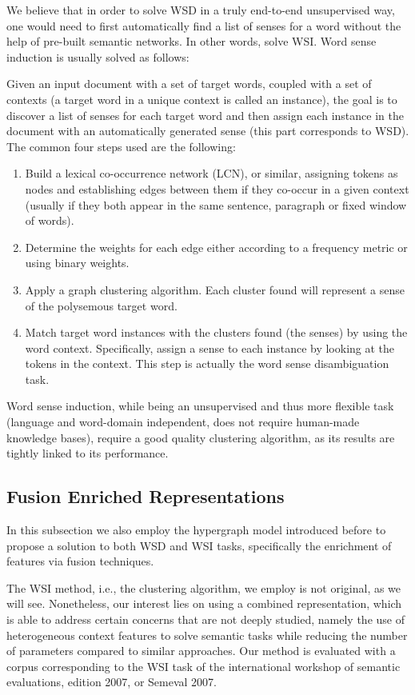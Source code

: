We believe that in order to solve WSD in a truly end-to-end unsupervised way, one would need to first automatically find a list of senses for a word without the help of pre-built semantic networks. In other words, solve WSI. Word sense induction is usually solved as follows:

Given an input document with a set of target words, coupled with a set of contexts (a target word in a unique context is called an instance), the goal is to discover a list of senses for each target word and then assign each instance in the document with an automatically generated sense (this part corresponds to WSD). The common four steps used are the following:

\begin{enumerate}
\item Build a lexical co-occurrence network (LCN), or similar, assigning tokens as nodes and  establishing edges between them if they co-occur in a given context (usually if they both appear in the same sentence, paragraph or fixed window of words).
\item Determine the weights for each edge either according to a frequency metric or using binary weights. 
\item Apply a graph clustering algorithm. Each cluster found will represent a sense of the polysemous target word.
\item Match target word instances with the clusters found (the senses) by using the word context. Specifically, assign a sense to each instance by looking at the tokens in the context. This step is actually the word sense disambiguation task. 
\end{enumerate}	


Word sense induction, while being an unsupervised and thus more flexible task (language and word-domain independent, does not require human-made knowledge bases), require a good quality clustering algorithm, as its results are tightly linked to its performance.
\subsection{Fusion Enriched Representations}

In this subsection we also employ the hypergraph model introduced before to propose a solution to both WSD and WSI tasks, specifically the enrichment of features via fusion techniques.

The WSI method, i.e., the clustering algorithm, we employ is not original, as we will see. Nonetheless, our interest lies on  using a combined representation, which is able to address certain concerns that are not deeply studied, namely the use of heterogeneous context features to solve semantic tasks while reducing the number of parameters compared to similar approaches.  Our method is evaluated with a corpus corresponding to the WSI task of the international workshop of semantic evaluations, edition 2007, or Semeval 2007. 


